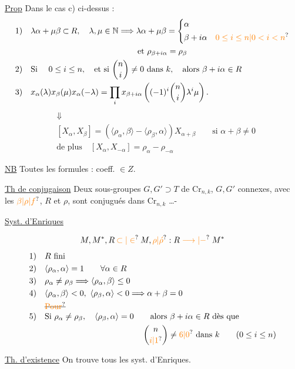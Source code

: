 \uline{Prop} Dans le cas c) ci-dessus :
\[
\begin{aligned}
1)\quad &\lambda\alpha+\mu\beta\mathbin{\subset}R,\quad\lambda,\mu\in\mathbb N
 \Longrightarrow\lambda\alpha+\mu\beta=
 \left\{\begin{aligned}&\alpha\\&\beta+i\alpha\quad\unsure{0\leq i\leq n|0<i<n}\end{aligned}\right.\\
&\hspace{13em}\text{et }\rho_{\beta+i\alpha}=\rho_\beta\\
2)\quad &\text{Si }\quad 0\leq i\leq n,\quad\text{et si }\binom ni\neq0\ \text{dans }k,\quad
\text{alors }\beta+i\alpha\in R\\
3)\quad &x_\alpha(\lambda)x_\beta(\mu)x_\alpha(-\lambda)=
 \prod_i x_{\beta+i\alpha}\left((-1)^i\binom ni\lambda^i\mu\right).
\end{aligned}
\]
\[
\begin{aligned}
&\Downarrow\\
&[X_\alpha,X_\beta]=(\langle\rho_\alpha,\beta\rangle-\langle\rho_\beta,\alpha\rangle)X_{\alpha+\beta}
 \qquad\text{si }\alpha+\beta\neq0\\
&\text{de plus}\quad[X_\alpha,X_{-\alpha}]=\rho_\alpha-\rho_{-\alpha}
\end{aligned}
\]

\uline{NB} Toutes les formules : coeff. $\in Z$.

\uline{Th de conjugaison} Deux sous-groupes $G,G'\supset T$ de $\mathrm{Cr}_{n,k}$,  $G,G'$ connexes, avec les  $\unsure{\beta|\rho|f}$, $R$ et $\rho$, sont conjugués dans $\mathrm{Cr}_{n,k}$ \ldots-

\uline{Syst. d'Enriques}

\[
M,M^*,R\mathbin{\unsure{\subset|\in}}M,\unsure{\rho|\acute{\rho}}:R\mathrel{\unsure{\longrightarrow|-}}M^*
\]
\[
\begin{aligned}
1)\quad &R\ \text{fini}\\
2)\quad &\langle\rho_\alpha,\alpha\rangle=1\qquad\forall\alpha\in R\\
3)\quad &\rho_\alpha\neq\rho_\beta\Longrightarrow\langle\rho_\alpha,\beta\rangle\leq0\\
4)\quad &\langle\rho_\alpha,\beta\rangle<0,\ \langle\rho_\beta,\alpha\rangle<0
 \Longrightarrow\alpha+\beta=0\\
&\text{\deleted{\unsure{Pour}}}\\[-3pt]
5)\quad &\text{Si }\rho_\alpha\neq\rho_\beta,\quad\langle\rho_\beta,\alpha\rangle=0\qquad
 \text{alors }\beta+i\alpha\in R\ \text{dès que}\\
&\hspace{12em}\binom{n}{\unsure{i|1}}\neq\unsure{6|0}\ \text{dans }k\qquad(0\leq i\leq n)
\end{aligned}
\]

\uline{Th. d'existence} On trouve tous les syst. d'Enriques.

